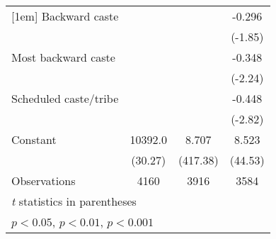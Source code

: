 {\begin{tabular}{l*{3}{c}}
[1em]
Backward caste      &                     &                     &      -0.296         \\
                    &                     &                     &     (-1.85)         \\
[1em]
Most backward caste &                     &                     &      -0.348\sym{*}  \\
                    &                     &                     &     (-2.24)         \\
[1em]
Scheduled caste/tribe&                     &                     &      -0.448\sym{**} \\
                    &                     &                     &     (-2.82)         \\
[1em]
Constant            &     10392.0\sym{***}&       8.707\sym{***}&       8.523\sym{***}\\
                    &     (30.27)         &    (417.38)         &     (44.53)         \\
\hline
Observations        &        4160         &        3916         &        3584         \\
\hline\hline
\multicolumn{4}{l}{\footnotesize \textit{t} statistics in parentheses}\\
\multicolumn{4}{l}{\footnotesize \sym{*} \(p<0.05\), \sym{**} \(p<0.01\), \sym{***} \(p<0.001\)}\\
\end{tabular}
}
